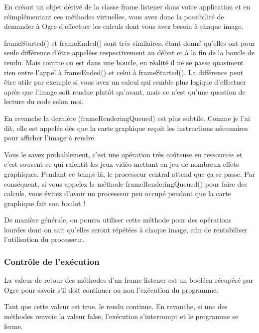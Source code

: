 \documentclass[10pt,a4paper]{report}
\begin{document}
En cr\'eant un objet d\'eriv\'e de la classe frame listener dans votre application et en r\'eimpl\'ementant ces m\'ethodes virtuelles, vous avez donc la possibilit\'e de demander \`{a} Ogre d'effectuer les calculs dont vous avez besoin \`{a} chaque image.



frameStarted() et frameEnded() sont tr\`es similaires, \'etant donn\'e qu'elles ont pour seule diff\'erence d'\^etre appel\'ees respectivement au d\'ebut et \`{a} la fin de la boucle de rendu. Mais comme on est dans une boucle, en r\'ealit\'e il ne se passe quasiment rien entre l'appel \`{a} frameEnded() et celui \`{a} frameStarted(). La diff\'erence peut \^etre utile par exemple si vous avez un calcul qui semble plus logique d'effectuer apr\`es que l'image soit rendue plut\^ot qu'avant, mais ce n'est qu'une question de lecture du code selon moi.


En revanche la derni\`ere (frameRenderingQueued) est plus subtile. Comme je l'ai dit, elle est appel\'ee d\`es que la carte graphique re\c{c}oit les instructions n\'ecessaires pour afficher l'image \`{a} rendre.


Vous le savez probablement, c'est une op\'eration tr\`es co\^uteuse en ressources et c'est souvent ce qui ralentit les jeux vid\'eo mettant en jeu de nombreux effets graphiques. Pendant ce temps-l\`{a}, le processeur central attend que \c{c}a se passe. Par cons\'equent, si vous appelez la m\'ethode frameRenderingQueued() pour faire des calculs, vous \'evitez d'avoir un processeur peu occup\'e pendant que la carte graphique fait son boulot !

De mani\`ere g\'en\'erale, on pourra utiliser cette m\'ethode pour des op\'erations lourdes dont on sait qu'elles seront r\'ep\'et\'ees \`{a} chaque image, afin de rentabiliser l'utilisation du processeur.




\subsubsection{Contr\^ole de l'ex\'ecution}

La valeur de retour des m\'ethodes d'un frame listener est un bool\'een r\'ecup\'er\'e par Ogre pour savoir s'il doit continuer ou non l'ex\'ecution du programme.

Tant que cette valeur est true, le rendu continue. En revanche, si une des m\'ethodes renvoie la valeur false, l'ex\'ecution s'interrompt et le programme se ferme.
\end{document}
